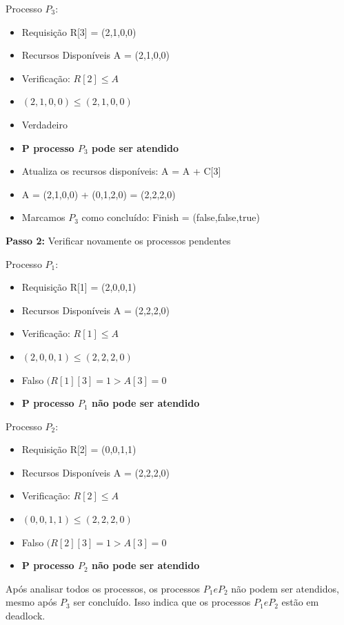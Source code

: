 \documentclass{article}
\begin{document}
Processo $P_3:$
\begin{itemize}
  \item Requisição R[3] = (2,1,0,0)
  \item Recursos Disponíveis A = (2,1,0,0)
  \item Verificação: $R[2] \leq A$
  \item $(2,1,0,0) \leq (2,1,0,0)$
  \item Verdadeiro
  \item \textbf{P processo $P_3$ pode ser atendido}
  \item Atualiza os recursos disponíveis: A = A + C[3]
  \item A = (2,1,0,0) + (0,1,2,0) = (2,2,2,0)
  \item Marcamos $P_3$ como concluído: Finish = (false,false,true)\newline
\end{itemize}

\textbf{Passo 2:} Verificar novamente os processos pendentes\newline

Processo $P_1:$
\begin{itemize}
  \item Requisição R[1] = (2,0,0,1)
  \item Recursos Disponíveis A = (2,2,2,0)
  \item Verificação: $R[1] \leq A$
  \item $(2,0,0,1) \leq (2,2,2,0)$
  \item Falso $(R[1][3]=1 > A[3]=0$
  \item \textbf{P processo $P_1$ não pode ser atendido}\newline
\end{itemize}

Processo $P_2:$
\begin{itemize}
  \item Requisição R[2] = (0,0,1,1)
  \item Recursos Disponíveis A = (2,2,2,0)
  \item Verificação: $R[2] \leq A$
  \item $(0,0,1,1) \leq (2,2,2,0)$
  \item Falso $(R[2][3]=1 > A[3]=0$
  \item \textbf{P processo $P_2$ não pode ser atendido}\newline
\end{itemize}

Após analisar todos os processos, os processos $P_1 e P_2$ não podem ser atendidos, mesmo após $P_3$ ser concluído. Isso indica que os processos $P_1 e P_2$ estão em deadlock.
\end{document}
